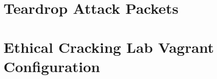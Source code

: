 \documentclass{report}
\begin{document}
\printbibliography

\appendix

\chapter{Teardrop Attack Packets}
\label{appendix:packets}


\pagebreak


\chapter{Ethical Cracking Lab Vagrant Configuration}
\label{appendix:vagrant}


\end{document}
